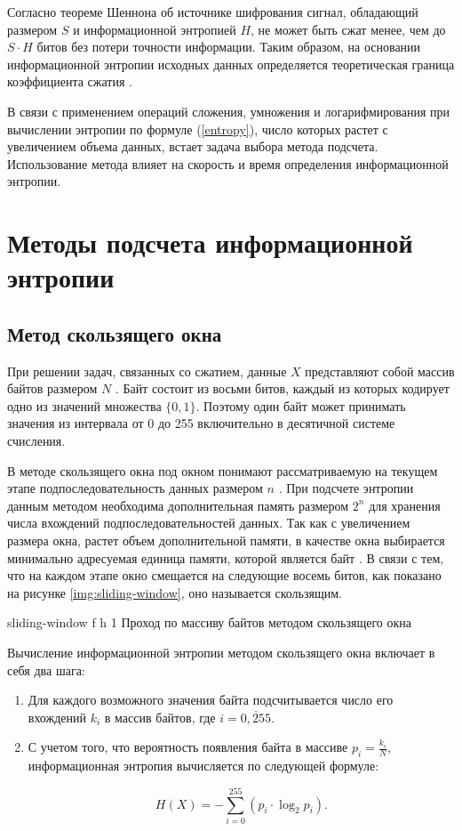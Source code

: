 Согласно теореме Шеннона об источнике шифрования сигнал, обладающий размером $S$ и информационной энтропией $H$, не может быть сжат менее, чем до $S \cdot H$ битов без потери точности информации. Таким образом, на основании информационной энтропии исходных данных определяется теоретическая граница коэффициента сжатия \cite{theorem}.

В связи с применением операций сложения, умножения и логарифмирования при вычислении энтропии по формуле (\ref{entropy}), число которых растет с увеличением объема данных, встает задача выбора метода подсчета. Использование метода влияет на скорость и время определения информационной энтропии.

\section{Методы подсчета информационной энтропии}

\subsection{Метод скользящего окна}

При решении задач, связанных со сжатием, данные $X$ представляют собой массив байтов размером $N$ \cite{bytes}. Байт состоит из восьми битов, каждый из которых кодирует одно из значений множества $\{0, 1\}$. Поэтому один байт может принимать значения из интервала от 0 до 255 включительно в десятичной системе счисления. 

В методе скользящего окна под окном понимают рассматриваемую на текущем этапе подпоследовательность данных размером $n$ \cite{sliding-window-method}. При подсчете энтропии данным методом необходима дополнительная память размером $2^n$ для хранения числа вхождений подпоследовательностей данных. Так как с увеличением размера окна, растет объем дополнительной памяти, в качестве окна выбирается минимально адресуемая единица памяти, которой является байт \cite{memory-unit}. В связи с тем, что на каждом этапе окно смещается на следующие восемь битов, как показано на рисунке \ref{img:sliding-window}, оно называется скользящим.

    {sliding-window}
    {f}
    {h}
    {1\textwidth}
    {Проход по массиву байтов методом скользящего окна}
    
Вычисление информационной энтропии методом скользящего окна включает в себя два шага:

\begin{enumerate}
	\item Для каждого возможного значения байта подсчитывается число его вхождений $k_{i}$ в массив байтов, где $i = \overline{0, 255}$.
	\item С учетом того, что вероятность появления байта в массиве $p_{i} = \frac{k_{i}}{N}$, информационная энтропия вычисляется по следующей формуле:
	
	\begin{equation}
		H(X) = -\sum_{i = 0}^{255} (p_{i} \cdot \log_{2}p_{i}).
	\end{equation}
\end{enumerate}

